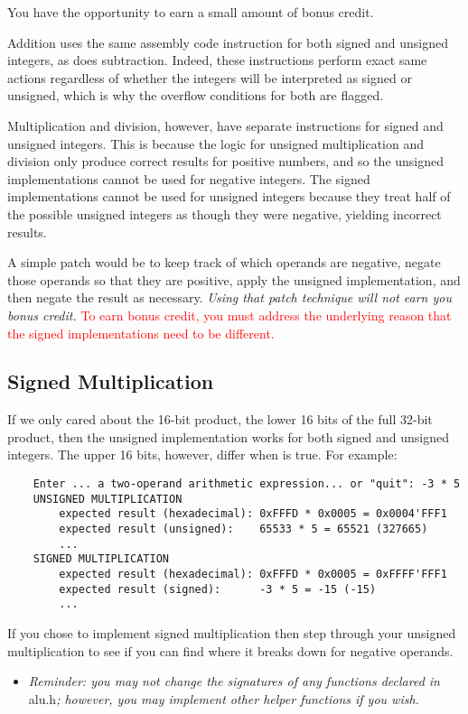 You have the opportunity to earn a small amount of bonus credit.

Addition uses the same assembly code instruction for both signed and unsigned integers, as does subtraction.
Indeed, these instructions perform exact same actions regardless of whether the integers will be interpreted as signed or unsigned, which is why the overflow conditions for both are flagged.

Multiplication and division, however, have separate instructions for signed and unsigned integers.
This is because the logic for unsigned multiplication and division only produce correct results for positive numbers, and so the unsigned implementations cannot be used for negative integers.
The signed implementations cannot be used for unsigned integers because they treat half of the possible unsigned integers as though they were negative, yielding incorrect results.

A simple patch would be to keep track of which operands are negative, negate those operands so that they are positive, apply the unsigned implementation, and then negate the result as necessary.
\textit{Using that patch technique will not earn you bonus credit.}
\textcolor{red}{To earn bonus credit, you must address the underlying reason that the signed implementations need to be different.}

\subsection{Signed Multiplication}

If we only cared about the 16-bit product, the lower 16 bits of the full 32-bit product, then the unsigned implementation works for both signed and unsigned integers.
The upper 16 bits, however, differ when  is true.
For example:
\begin{verbatim}
    Enter ... a two-operand arithmetic expression... or "quit": -3 * 5
    UNSIGNED MULTIPLICATION
        expected result (hexadecimal): 0xFFFD * 0x0005 = 0x0004'FFF1
        expected result (unsigned):    65533 * 5 = 65521 (327665)
        ...
    SIGNED MULTIPLICATION
        expected result (hexadecimal): 0xFFFD * 0x0005 = 0xFFFF'FFF1
        expected result (signed):      -3 * 5 = -15 (-15)
        ...
\end{verbatim}

If you chose to implement signed multiplication then step through your unsigned multiplication to see if you can find where it breaks down for negative operands.
\begin{description}
    \begin{itemize}
        \item \textit{Reminder: you may not change the signatures of any functions declared in }alu.h\textit{; however, you may implement other helper functions if you wish.}
    \end{itemize}
\end{description}



